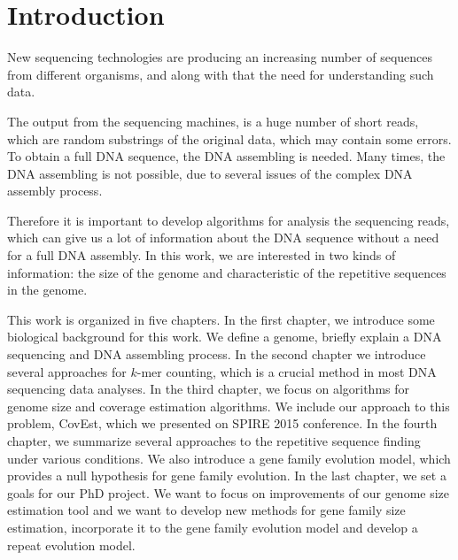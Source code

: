 \chapter*{Introduction}
{}

New sequencing technologies are producing an increasing number of sequences from different organisms, and along with that the need for understanding such data.

The output from the sequencing machines, is a huge number of short reads, which are random substrings of the original data, which may contain some errors. To obtain a full DNA sequence, the DNA assembling is needed. Many times, the DNA assembling is not possible, due to several issues of the complex DNA assembly process.

Therefore it is important to develop algorithms for analysis the sequencing reads, which can give us a lot of information about the DNA sequence without a need for a full DNA assembly.
In this work, we are interested in two kinds of information: the size of the genome and characteristic of the repetitive sequences in the genome.

This work is organized in five chapters.
In the first chapter, we introduce some biological background for this work. We define a genome, briefly explain a DNA sequencing and DNA assembling process.
In the second chapter we introduce several approaches for $k$-mer counting, which is a crucial method in most DNA sequencing data analyses.
In the third chapter, we focus on algorithms for genome size and coverage estimation algorithms. We include our approach to this problem, CovEst\cite{covest}, which we presented on SPIRE 2015 conference.
In the fourth chapter, we summarize several approaches to the repetitive sequence finding under various conditions. We also introduce a gene family evolution model, which provides a null hypothesis for gene family evolution.
In the last chapter, we set a goals for our PhD project. We want to focus on improvements of our genome size estimation tool and we want to develop new methods for gene family size estimation, incorporate it to the gene family evolution model and develop a repeat evolution model.
